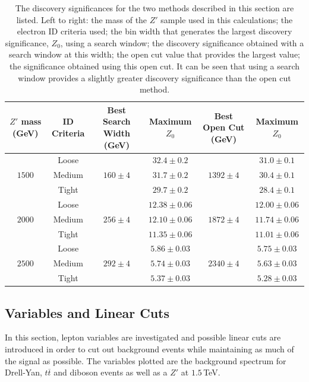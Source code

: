 \documentclass{article}
\begin{document}
\begin{table}[h!t]
\label{table:discoverySignificance}
\centering
\caption{The discovery significances for the two methods described in this section are listed. Left to right: the mass of the $Z'$ sample used in this calculations; the electron ID criteria used; the bin width that generates the largest discovery significance, $Z_0$, using a search window; the discovery significance obtained with a search window at this width; the open cut value that provides the largest value; the significance obtained using this open cut. It can be seen that using a search window provides a slightly greater discovery significance than the open cut method.}
\begin{tabular}{ |c|c|c|c|c|c| } 
\hline
$Z'$ mass (GeV) &  ID Criteria & Best Search Width (GeV) & Maximum $Z_0$ & Best Open Cut (GeV) &Maximum $Z_0$\\
\hline
\multirow{3}{*}{$1500$}  & Loose & \multirow{3}{*}{$160\pm4$}& $32.4\pm0.2$ & \multirow{3}{*}{$1392\pm4$} &$31.0\pm0.1$ \\\cline{2-2}\cline{4-4}\cline{6-6}
& Medium  & & $31.7\pm0.2$ & & $30.4\pm0.1$\\\cline{2-2}\cline{4-4}\cline{6-6}
& Tight &  & $29.7\pm0.2$ & & $28.4\pm0.1$\\\hline
\multirow{3}{*}{$2000$} & Loose & \multirow{3}{*}{$256\pm4$}& $12.38\pm0.06$ & \multirow{3}{*}{$1872\pm4$} & $12.00\pm0.06$\\\cline{2-2}\cline{4-4}\cline{6-6}
&  Medium & & $12.10\pm0.06$ & & $11.74\pm0.06$ \\\cline{2-2}\cline{4-4}\cline{6-6}
&  Tight & & $11.35\pm0.06$ & & $11.01\pm0.06$\\\hline
\multirow{3}{*}{$2500$} &  Loose & \multirow{3}{*}{$292\pm4$}& $5.86\pm0.03$ & \multirow{3}{*}{$2340\pm4$} & $5.75\pm0.03$ \\\cline{2-2}\cline{4-4}\cline{6-6}
&  Medium & & $5.74\pm0.03$ & & $5.63\pm0.03$\\\cline{2-2}\cline{4-4}\cline{6-6}
&  Tight  & & $5.37\pm0.03$ & & $5.28\pm0.03$\\\hline
\end{tabular}
\end{table}

\subsection{Variables and Linear Cuts}

In this section, lepton variables are investigated and possible linear cuts are introduced in order to cut out background events while maintaining as much of the signal as possible. The variables plotted are the background spectrum for Drell-Yan, $t\overline{t}$ and diboson events as well as a $Z'$ at $1.5\,$TeV.
\end{document}
